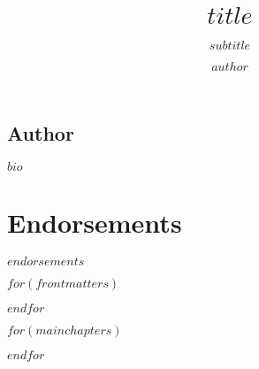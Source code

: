 \documentclass[nemilov1]{Nemilov}
\begin{document}
\frontmatter


\bigskip
\section*{Author}
$bio$


\title{$title$}
\subtitle{$subtitle$}


\author{$author$}

\maketitle

\setcounter{page}{5}

\bigskip

\chapter*{Endorsements}
$endorsements$

\bigskip

\tableofcontents

$for(frontmatters)$

$endfor$



\mainmatter


$for(mainchapters)$

$endfor$

%
%

\appendix

%

\cleardoublepage




\cleardoublepage
\printindex
\cleardoublepage


\clearpage


\end{document}
